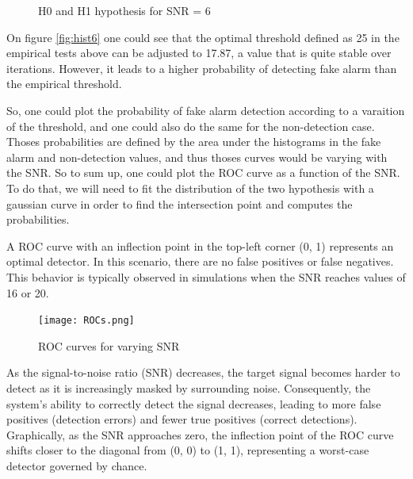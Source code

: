 \begin{figure}[h]
    \centering
	\caption{H0 and H1 hypothesis for SNR = 6}
\end{figure}

On figure \ref{fig:hist6} one could see that the optimal threshold defined as 25 in the empirical tests above can be adjusted to 17.87, a value that is quite stable over iterations. However, it leads to a higher probability of detecting fake alarm than the empirical threshold.

So, one could plot the probability of fake alarm detection according to a varaition of the threshold, and one could also do the same for the non-detection case. Thoses probabilities are defined by the area under the histograms in the fake alarm and non-detection values, and thus thoses curves would be varying with the SNR. So to sum up, one could plot the ROC curve as a function of the SNR. To do that, we will need to fit the distribution of the two hypothesis with a gaussian curve in order to find the intersection point and computes the probabilities.

A ROC curve with an inflection point in the top-left corner (0, 1) represents an optimal detector. In this scenario, there are no false positives or false negatives. This behavior is typically observed in simulations when the SNR reaches values of 16 or 20.

\begin{figure}[h]
	\centering
	\texttt{[image: ROCs.png]}
	\caption{ROC curves for varying SNR}
	\label{fig:ROCs}
\end{figure}

As the signal-to-noise ratio (SNR) decreases, the target signal becomes harder to detect as it is increasingly masked by surrounding noise. Consequently, the system's ability to correctly detect the signal decreases, leading to more false positives (detection errors) and fewer true positives (correct detections). Graphically, as the SNR approaches zero, the inflection point of the ROC curve shifts closer to the diagonal from (0, 0) to (1, 1), representing a worst-case detector governed by chance.

